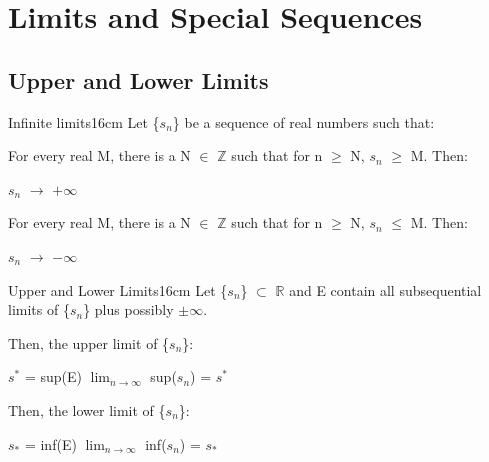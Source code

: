 \newpage

\section[Day 9: Limits \& Special Sequences]{ Limits and Special Sequences }

\subsection{ Upper and Lower Limits } 

	\begin{definition}{Infinite limits}{16cm}
		Let \{$s_n$\} be a sequence of real numbers such that:

		\hspace{0.5cm}
		For every real M, there is a N $\in$ $\mathbb{Z}$ such that
		for n $\geq$ N, $s_n$ $\geq$ M. Then:

		\hspace{1cm}
		$s_n$ $\rightarrow$ $+\infty$

		\hspace{0.5cm}
		For every real M, there is a N $\in$ $\mathbb{Z}$ such that
		for n $\geq$ N, $s_n$ $\leq$ M. Then:

		\hspace{1cm}
		$s_n$ $\rightarrow$ $-\infty$		
	\end{definition}
	
	\vspace{0.5cm}



	\begin{definition}{Upper and Lower Limits}{16cm}
		Let \{$s_n$\} $\subset$ $\mathbb{R}$
		and E contain all subsequential limits of \{$s_n$\}
		plus possibly $\pm$$\infty$.

		Then, the {\color{lblue} upper limit} of \{$s_n$\}:

		\hspace{1cm}
		$s^*$ = sup(E) 
		\hspace{1cm} 
		$\lim_{n \rightarrow \infty}$ sup($s_n$) = $s^*$

		Then, the {\color{lblue} lower limit} of \{$s_n$\}:

		\hspace{1cm}
		$s_*$ = inf(E) 
		\hspace{1.2cm} 
		$\lim_{n \rightarrow \infty}$ inf($s_n$) = $s_*$
	\end{definition}
	


